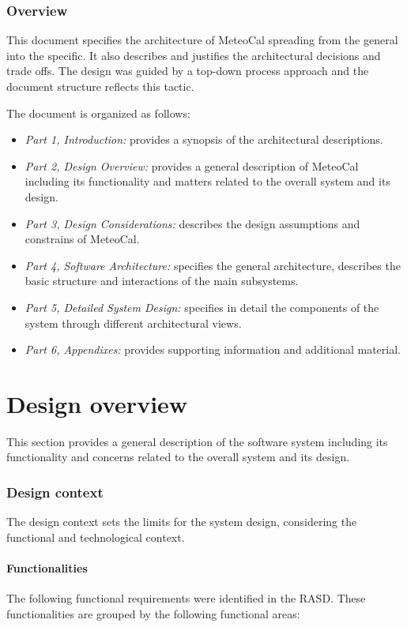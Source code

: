 \documentclass[10pt,a4paper,titlepage]{article}
\begin{document}
\section{Overview}
This document specifies the architecture of MeteoCal spreading from the general into the specific. It also describes and justifies the architectural decisions and trade offs.
The design was guided by a top-down process approach and the document structure reflects this tactic.

The document is organized as follows:
\begin{itemize}
\item \emph{Part 1, Introduction:} provides a synopsis of the architectural descriptions.
\item \emph{Part 2, Design Overview:} provides a general description of MeteoCal including its functionality and matters related to the overall system and its design.
\item \emph{Part 3, Design Considerations:} describes the design assumptions and constrains of MeteoCal.
\item \emph{Part 4, Software Architecture:} specifies the general architecture, describes the basic structure and interactions of the main subsystems.
\item \emph{Part 5, Detailed System Design:} specifies in detail the components of the system through different architectural views.
\item \emph{Part 6, Appendixes:} provides supporting information and additional material.
\end{itemize}

\clearpage
\part{Design overview}
This section provides a general description of the software system including its functionality and concerns related to the overall system and its design.

\section{Design context}
The design context sets the limits for the system design, considering the functional and technological context.

\subsection{Functionalities}
The following functional requirements were identified in the RASD. These functionalities are grouped by the following functional areas:
\end{document}
